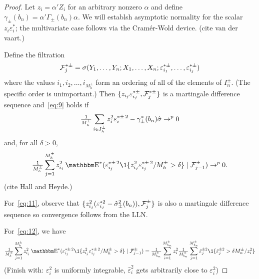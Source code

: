 \documentclass[12pt,fleqn]{article}
\begin{document}
\begin{proof}
  Let $z_i = \alpha' Z_i$ for an arbitrary nonzero $\alpha$ and define
  $\gamma_\pm(b_n) = \alpha'\Gamma_\pm(b_n)\alpha$. We will
  establsh asymptotic normality for the scalar $z_i \varepsilon_i^*$;
  the multivariate case follows via the Cram\'er-Wold device. (cite
  van der vaart.)

  Define the filtration
  \begin{equation}
    \label{eq:10}
    \mathcal{F}_j^{*\pm} = \sigma(Y_1,\dots,Y_n; X_1,\dots,X_n;
    \varepsilon_{i_1}^{*\pm},\dots,\varepsilon_{i_j}^{*\pm})
  \end{equation}
  where the values $i_1, i_2,\dots, i_{M_h^{\pm}}$ form an ordering of
  all of the elements of $I_n^\pm$. (The specific order is
  unimportant.) Then
  $\{z_{i_j} \varepsilon_{i_j}^{*\pm}, \mathcal{F}_j^{*\pm}\}$ is a martingale
  difference sequence and~\eqref{eq:9} holds if
  \begin{equation}
    \label{eq:11}
    \tfrac{1}{M_{h}^{\pm}} \sum_{i \in I_{h}^{\pm}} z_{i}^2 \varepsilon_{i}^{*\pm\,2} -
    \gamma_{\pm}^*(b_n) \hat\sigma
    \to^p 0
  \end{equation}
  and, for all
  $\delta > 0$,
  \begin{equation}
    \label{eq:12}
    \oavg{j}{h} z_{i_j}^2 \E^*( \varepsilon_{i_j}^{*\pm\,2}
    \1\{z_{i_j}^2 \varepsilon_{i_j}^{*\pm\,2} / M_h^\pm > \delta \}
    \mid \Fc_{j-1}^{\pm}) \to^p 0.
  \end{equation}
  (cite Hall and Heyde.)

  For~\eqref{eq:11}, observe that
  $\{z_{i_j}^2 (\varepsilon_{i_j}^{*2} - \hat\sigma^2_\pm(b_n)), \mathcal{F}_j^\pm\}$
  is also a martingale difference sequence so convergence follows from
  the LLN.

  For~\eqref{eq:12}, we have
  \begin{align*}
    \oavg{j}{h} z_{i_j}^2 \E^*( \varepsilon_{i_j}^{*\pm\,2}
    \1\{z_{i_j}^2 \varepsilon_{i_j}^{*\pm\,2} / M_h^\pm > \delta \}
    \mid \Fc_{j-1}^{\pm})
    &= \oavg{i}{h_n} z_i^2 \oavg{j}{b_n} \hat\varepsilon_{j}^{\pm 2}
      \1\{\hat\varepsilon_{j}^{\pm 2} > \delta M_n^{\pm} / z_i^2 \} \\
  \end{align*}
  (Finish with: $\varepsilon_i^2$ is uniformly integrable,
  $\hat\varepsilon_i^2$ gets arbitrarily close to $\varepsilon_i^2$)
\end{proof}

\clearpage


\end{document}
